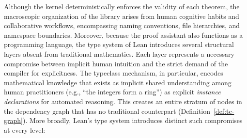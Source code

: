Although the kernel deterministically enforces the validity of each theorem, the macroscopic organization of the library arises from human cognitive habits and collaborative workflows, encompassing naming conventions, file hierarchies, and namespace boundaries. Moreover, because the proof assistant also functions as a programming language, the type system of Lean introduces several structural layers absent from traditional mathematics. Each layer represents a necessary compromise between implicit human intuition and the strict demand of the compiler for explicitness. The typeclass mechanism, in particular, encodes mathematical knowledge that exists as implicit shared understanding among human practitioners (e.g., ``the integers form a ring'') as explicit \emph{instance declarations} for automated reasoning. This creates an entire stratum of nodes in the dependency graph that has no traditional counterpart (Definition~\ref{def:tc-graph}). More broadly, Lean's type system introduces distinct such compromises at every level:
